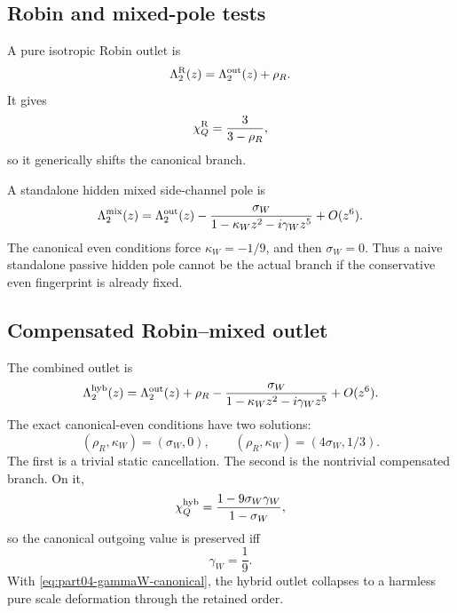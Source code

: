 \subsection{Robin and mixed-pole tests}
\label{subsec:part04-robin-mixed-tests}

A pure isotropic Robin outlet is
\begin{equation}
\label{eq:part04-robin-outlet}
\Lambda_2^{\rm R}(z)=\Lambda_2^{\rm out}(z)+\rho_R.
\end{equation}
It gives
\begin{equation}
\label{eq:part04-chi-robin}
\chi_Q^{\rm R}=\frac{3}{3-\rho_R},
\end{equation}
so it generically shifts the canonical branch.

A standalone hidden mixed side-channel pole is
\begin{equation}
\label{eq:part04-mixed-pole-outlet}
\Lambda_2^{\rm mix}(z)
=
\Lambda_2^{\rm out}(z)
-
\frac{\sigma_W}{1-\kappa_Wz^2-i\gamma_Wz^5}+O(z^6).
\end{equation}
The canonical even conditions force \(\kappa_W=-1/9\), and then \(\sigma_W=0\).  Thus a naive standalone passive hidden pole cannot be the actual branch if the conservative even fingerprint is already fixed.

\subsection{Compensated Robin--mixed outlet}
\label{subsec:part04-compensated-robin-mixed}

The combined outlet is
\begin{equation}
\label{eq:part04-hybrid-outlet}
\Lambda_2^{\rm hyb}(z)
=
\Lambda_2^{\rm out}(z)+\rho_R
-
\frac{\sigma_W}{1-\kappa_Wz^2-i\gamma_Wz^5}+O(z^6).
\end{equation}
The exact canonical-even conditions have two solutions:
\begin{equation}
\label{eq:part04-hybrid-even-solutions}
(\rho_R,\kappa_W)=(\sigma_W,0),
\qquad
(\rho_R,\kappa_W)=(4\sigma_W,1/3).
\end{equation}
The first is a trivial static cancellation.  The second is the nontrivial compensated branch.  On it,
\begin{equation}
\label{eq:part04-hybrid-chiQ}
\chi_Q^{\rm hyb}
=
\frac{1-9\sigma_W\gamma_W}{1-\sigma_W},
\end{equation}
so the canonical outgoing value is preserved iff
\begin{equation}
\label{eq:part04-gammaW-canonical}
\gamma_W=\frac19.
\end{equation}
With \eqref{eq:part04-gammaW-canonical}, the hybrid outlet collapses to a harmless pure scale deformation through the retained order.


